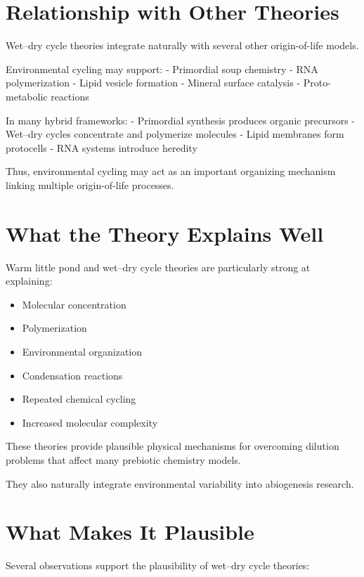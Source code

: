 \documentclass[
  oneside]{book}
\providecommand{\tightlist}{%
  \setlength{\itemsep}{0pt}\setlength{\parskip}{0pt}}
\begin{document}
\section{Relationship with Other Theories}\label{relationship-with-other-theories}

Wet--dry cycle theories integrate naturally with several other origin-of-life models.

Environmental cycling may support:
- Primordial soup chemistry
- RNA polymerization
- Lipid vesicle formation
- Mineral surface catalysis
- Proto-metabolic reactions

In many hybrid frameworks:
- Primordial synthesis produces organic precursors
- Wet--dry cycles concentrate and polymerize molecules
- Lipid membranes form protocells
- RNA systems introduce heredity

Thus, environmental cycling may act as an important organizing mechanism linking multiple origin-of-life processes.

\section{What the Theory Explains Well}\label{what-the-theory-explains-well-4}

Warm little pond and wet--dry cycle theories are particularly strong at explaining:

\begin{itemize}
\tightlist
\item
  Molecular concentration
\item
  Polymerization
\item
  Environmental organization
\item
  Condensation reactions
\item
  Repeated chemical cycling
\item
  Increased molecular complexity
\end{itemize}

These theories provide plausible physical mechanisms for overcoming dilution problems that affect many prebiotic chemistry models.

They also naturally integrate environmental variability into abiogenesis research.

\section{What Makes It Plausible}\label{what-makes-it-plausible-4}

Several observations support the plausibility of wet--dry cycle theories:
\end{document}
